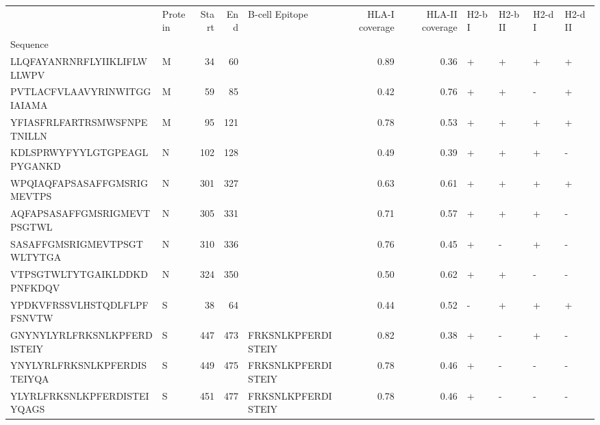 \begin{tabular}{llrrlrrllll}
\toprule
{} & Protein &  Start &   End &      B-cell Epitope &  HLA-I coverage &  HLA-II coverage & H2-b I & H2-b II & H2-d I & H2-d II \\
Sequence                    &         &        &       &                     &                 &                  &        &         &        &         \\
\midrule
LLQFAYANRNRFLYIIKLIFLWLLWPV &       M &     34 &    60 &                     &            0.89 &             0.36 &      + &       + &      + &       + \\
PVTLACFVLAAVYRINWITGGIAIAMA &       M &     59 &    85 &                     &            0.42 &             0.76 &      + &       + &      - &       + \\
YFIASFRLFARTRSMWSFNPETNILLN &       M &     95 &   121 &                     &            0.78 &             0.53 &      + &       + &      + &       + \\
KDLSPRWYFYYLGTGPEAGLPYGANKD &       N &    102 &   128 &                     &            0.49 &             0.39 &      + &       + &      + &       - \\
WPQIAQFAPSASAFFGMSRIGMEVTPS &       N &    301 &   327 &                     &            0.63 &             0.61 &      + &       + &      + &       + \\
AQFAPSASAFFGMSRIGMEVTPSGTWL &       N &    305 &   331 &                     &            0.71 &             0.57 &      + &       + &      + &       - \\
SASAFFGMSRIGMEVTPSGTWLTYTGA &       N &    310 &   336 &                     &            0.76 &             0.45 &      + &       - &      + &       - \\
VTPSGTWLTYTGAIKLDDKDPNFKDQV &       N &    324 &   350 &                     &            0.50 &             0.62 &      + &       + &      - &       - \\
YPDKVFRSSVLHSTQDLFLPFFSNVTW &       S &     38 &    64 &                     &            0.44 &             0.52 &      - &       + &      + &       + \\
GNYNYLYRLFRKSNLKPFERDISTEIY &       S &    447 &   473 &  FRKSNLKPFERDISTEIY &            0.82 &             0.38 &      + &       - &      + &       - \\
YNYLYRLFRKSNLKPFERDISTEIYQA &       S &    449 &   475 &  FRKSNLKPFERDISTEIY &            0.78 &             0.46 &      + &       - &      - &       - \\
YLYRLFRKSNLKPFERDISTEIYQAGS &       S &    451 &   477 &  FRKSNLKPFERDISTEIY &            0.78 &             0.46 &      + &       - &      - &       - \\

\end{tabular}
